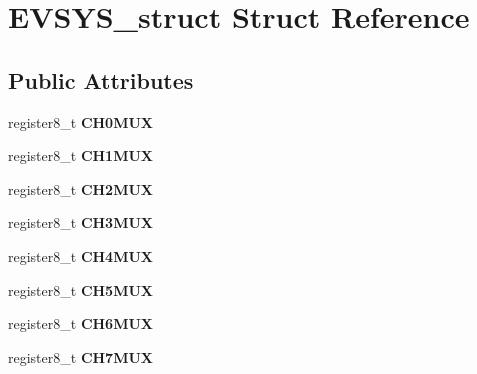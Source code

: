 \hypertarget{struct_e_v_s_y_s__struct}{}\section{E\+V\+S\+Y\+S\+\_\+struct Struct Reference}
\label{struct_e_v_s_y_s__struct}
\subsection*{Public Attributes}
\begin{DoxyCompactItemize}
\item 
register8\+\_\+t {\bfseries C\+H0\+M\+UX}\hypertarget{struct_e_v_s_y_s__struct_a6e32eebe659f4ccfdb2691cac4d035db}{}\label{struct_e_v_s_y_s__struct_a6e32eebe659f4ccfdb2691cac4d035db}

\item 
register8\+\_\+t {\bfseries C\+H1\+M\+UX}\hypertarget{struct_e_v_s_y_s__struct_a839d5a508a07c077506b9ec5571542b1}{}\label{struct_e_v_s_y_s__struct_a839d5a508a07c077506b9ec5571542b1}

\item 
register8\+\_\+t {\bfseries C\+H2\+M\+UX}\hypertarget{struct_e_v_s_y_s__struct_a21be25ecf59502d103b0db7485425020}{}\label{struct_e_v_s_y_s__struct_a21be25ecf59502d103b0db7485425020}

\item 
register8\+\_\+t {\bfseries C\+H3\+M\+UX}\hypertarget{struct_e_v_s_y_s__struct_ab7220aa439f0fe0b4a3e57fd2d0d8c52}{}\label{struct_e_v_s_y_s__struct_ab7220aa439f0fe0b4a3e57fd2d0d8c52}

\item 
register8\+\_\+t {\bfseries C\+H4\+M\+UX}\hypertarget{struct_e_v_s_y_s__struct_ae82c118d87c46ad16666e966adbe840c}{}\label{struct_e_v_s_y_s__struct_ae82c118d87c46ad16666e966adbe840c}

\item 
register8\+\_\+t {\bfseries C\+H5\+M\+UX}\hypertarget{struct_e_v_s_y_s__struct_a9dff4895d04141740c4001f3d53713f7}{}\label{struct_e_v_s_y_s__struct_a9dff4895d04141740c4001f3d53713f7}

\item 
register8\+\_\+t {\bfseries C\+H6\+M\+UX}\hypertarget{struct_e_v_s_y_s__struct_a612bf2914796036a52ef64f3d6d7e355}{}\label{struct_e_v_s_y_s__struct_a612bf2914796036a52ef64f3d6d7e355}

\item 
register8\+\_\+t {\bfseries C\+H7\+M\+UX}\hypertarget{struct_e_v_s_y_s__struct_ab4be597a375669e49b5c71dad4bacdb4}{}\label{struct_e_v_s_y_s__struct_ab4be597a375669e49b5c71dad4bacdb4}


\end{DoxyCompactItemize}
